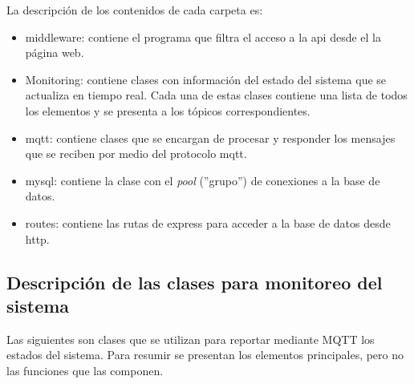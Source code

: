 La descripción de los contenidos de cada carpeta es:
\begin{itemize}
\item middleware: contiene el programa que filtra el acceso a la api desde el la página web.
\item Monitoring: contiene clases con información del estado del sistema que se actualiza en tiempo real. Cada una de estas clases contiene una lista de todos los elementos y se presenta a los tópicos correspondientes.
\item mqtt: contiene clases que se encargan de procesar y responder los mensajes que se reciben por medio del protocolo mqtt.
\item mysql: contiene la clase con el \textit{pool} (''grupo'') de conexiones a la base de datos.
\item routes: contiene las rutas de express para acceder a la base de datos desde http.
\end{itemize}

\subsection{Descripción de las clases para monitoreo del sistema}

Las siguientes son clases que se utilizan para reportar mediante MQTT los estados del sistema. Para resumir se presentan los elementos principales, pero no las funciones que las componen.

